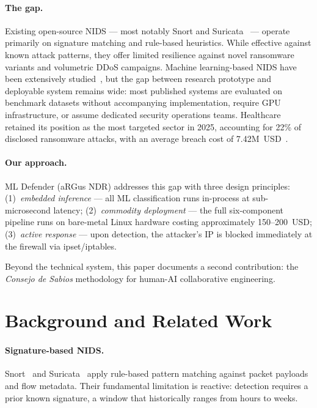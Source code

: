 \documentclass[11pt,a4paper]{article}
\begin{document}
    \paragraph{The gap.}
    Existing open-source NIDS --- most notably Snort and Suricata~\cite{oisf2010} --- operate
    primarily on signature matching and rule-based heuristics. While effective against known
    attack patterns, they offer limited resilience against novel ransomware variants and volumetric
    DDoS campaigns. Machine learning-based NIDS have been extensively studied~\cite{buczak2016,
        pinto2023}, but the gap between research prototype and deployable system remains wide: most
    published systems are evaluated on benchmark datasets without accompanying implementation,
    require GPU infrastructure, or assume dedicated security operations teams. Healthcare retained
    its position as the most targeted sector in 2025, accounting for 22\% of disclosed ransomware
    attacks, with an average breach cost of 7.42M~USD~\cite{blackfog2025,ibmsecurity2025}.

    \paragraph{Our approach.}
    ML Defender (aRGus NDR) addresses this gap with three design principles:
    (1)~\emph{embedded inference} --- all ML classification runs in-process at sub-microsecond
    latency;
    (2)~\emph{commodity deployment} --- the full six-component pipeline runs on bare-metal Linux
    hardware costing approximately 150--200~USD;
    (3)~\emph{active response} --- upon detection, the attacker's IP is blocked immediately at
    the firewall via ipset/iptables.

    Beyond the technical system, this paper documents a second contribution: the \emph{Consejo
    de Sabios} methodology for human-AI collaborative engineering.

    \section{Background and Related Work}

    \paragraph{Signature-based NIDS.}
    Snort~\cite{roesch1999} and Suricata~\cite{oisf2010} apply rule-based pattern matching
    against packet payloads and flow metadata. Their fundamental limitation is reactive:
    detection requires a prior known signature, a window that historically ranges from hours to
    weeks.
\end{document}
